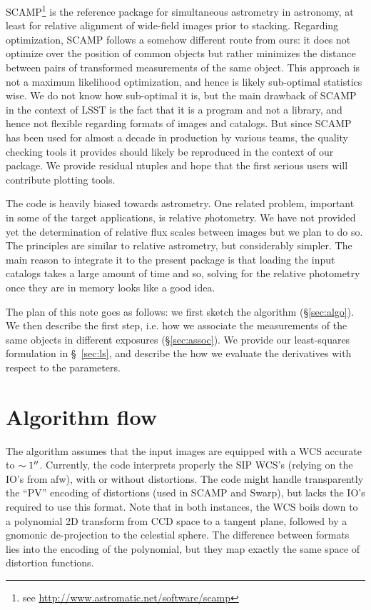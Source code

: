 \documentclass[a4paper,12pt]{scrartcl}
\def\arcsec{\hbox{$^{\prime\prime}$}}
\begin{document}
SCAMP\footnote{see \href{http://www.astromatic.net/software/scamp}{http://www.astromatic.net/software/scamp}} is the reference package for simultaneous astrometry in
astronomy, at least for relative alignment of wide-field images prior
to stacking. Regarding optimization, SCAMP follows a somehow different
route from ours: it does not optimize over the position of common
objects but rather minimizes the distance between pairs of transformed
measurements of the same object. This approach is not a maximum
likelihood optimization, and hence is likely sub-optimal statistics
wise. We do not know how sub-optimal it is, but the main drawback of
SCAMP in the context of LSST is the fact that it is a program and not
a library, and hence not flexible regarding formats of images and
catalogs.  But since SCAMP has been used for almost a decade in
production by various teams, the quality checking tools it provides
should likely be reproduced in the context of our package. We provide
residual ntuples and hope that the first serious users will contribute
plotting tools.

The code is heavily biased towards astrometry. One related problem,
important in some of the target applications, is relative {\textit
  photometry}.  We have not provided yet the determination of relative
flux scales between images but we plan to do so. The principles are
similar to relative astrometry, but considerably simpler. The main reason
to integrate it to the present package is that loading the input catalogs
takes a large amount of time and so, solving for the relative photometry
once they are in memory looks like a good idea.


The plan of this note goes as follows: we first sketch the algorithm
(\S \ref{sec:algo}). We then describe the first step, i.e. how we
associate the measurements of the same objects in different exposures (\S \ref{sec:assoc}). We provide our least-squares formulation in \S~\ref{sec:ls},
and describe the how we evaluate the derivatives with respect to the parameters.


\section{Algorithm flow \label{sec:algo}}
The algorithm assumes that the input images are equipped with a WCS
accurate to $\sim 1\arcsec$. Currently, the code interprets properly
the SIP WCS's (relying on the IO's from afw), with or without
distortions. The code might handle transparently the ``PV'' encoding
of distortions (used in SCAMP and Swarp), but lacks the 
IO's required to use this format.
Note that in both instances, the WCS boils down to a polynomial 2D
transform from CCD space to a tangent plane, followed by a gnomonic
de-projection to the celestial sphere.  The difference between formats
lies into the encoding of the polynomial, but they map exactly
the same space of distortion functions. 
\end{document}
